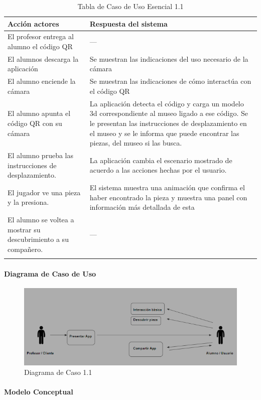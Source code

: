 \begin{longtable}{|p{5cm}|p{8cm}|}
\hline 
Acción actores & Respuesta del sistema \\ 
\hline 
El profesor entrega al alumno el código QR & --- \\ 
\hline
El alumnos descarga la aplicación & Se muestran las indicaciones del uso necesario de la cámara \\ 
\hline 
El alumno enciende la cámara  & Se muestran las indicaciones de cómo interactúa con el código QR \\ 
\hline
El alumno apunta el código QR con su cámara & La aplicación detecta el código y carga un modelo 3d correspondiente al museo ligado a ese código.
Se le presentan las instrucciones de desplazamiento en el museo y se le informa que puede encontrar las piezas, del museo si las busca.
 \\ 
\hline
El alumno prueba las instrucciones de desplazamiento. & La aplicación cambia el escenario mostrado de acuerdo a las acciones hechas por el usuario. \\ 
\hline
El jugador ve una pieza y la presiona. & El sistema muestra una animación que confirma el haber encontrado la pieza y muestra una panel con información más detallada de esta \\ 
\hline
El alumno se voltea a mostrar su descubrimiento a su compañero. & --- \\ 
\hline
\caption{Tabla de Caso de Uso Esencial 1.1}
\label{tab21}
\end{longtable}

\paragraph{Diagrama de Caso de Uso}

\begin{figure}[H]
\centerline{\includegraphics[width=15cm]{imgs/CasoUso_1.PNG}}
\caption{Diagrama de Caso 1.1}
\label{fig_1}
\end{figure}

\paragraph{Modelo Conceptual}

